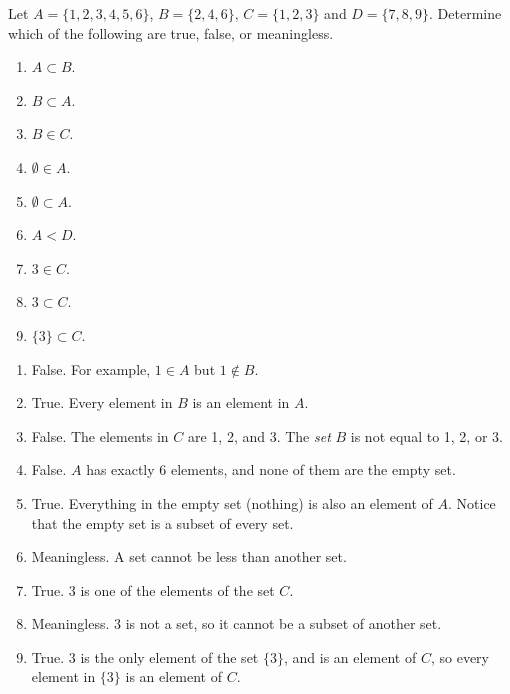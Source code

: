 \documentclass[11pt,]{book}
\theoremstyle{ptxplainnotitle}
\theoremstyle{ptxplaintitle}
\theoremstyle{ptxdefinitionnotitle}
\theoremstyle{ptxdefinitiontitle}
\theoremstyle{ptxdefinitionnotitle}
\theoremstyle{ptxdefinitiontitle}
\theoremstyle{ptxdefinitionnotitle}
\theoremstyle{ptxdefinitiontitle}
\theoremstyle{ptxdefinitiontitlenonumber}
\theoremstyle{ptxdefinitiontitlenonumber}
\numberwithin{equation}{chapter}
\newcommand{\lt}{<}
\begin{document}
\begin{example}\label{example-29}
\hypertarget{p-722}{}%
Let \(A = \{1, 2, 3, 4, 5, 6\}\), \(B = \{2, 4, 6\}\), \(C = \{1, 2, 3\}\) and \(D = \{7, 8, 9\}\). Determine which of the following are true, false, or meaningless.%
\par
\hypertarget{p-723}{}%
\leavevmode%
\begin{enumerate}
\item\hypertarget{li-291}{}\(A \subset B\).%
\item\hypertarget{li-292}{}\(B \subset A\).%
\item\hypertarget{li-293}{}\(B \in C\).%
\item\hypertarget{li-294}{}\(\emptyset \in A\).%
\item\hypertarget{li-295}{}\(\emptyset \subset A\).%
\item\hypertarget{li-296}{}\(A \lt  D\).%
\item\hypertarget{li-297}{}\(3 \in C\).%
\item\hypertarget{li-298}{}\(3 \subset C\).%
\item\hypertarget{li-299}{}\(\{3\} \subset C\).%
\end{enumerate}
%
\par\smallskip%
\noindent\textbf{}\hypertarget{solution-104}{}\hypertarget{p-724}{}%
\leavevmode%
\begin{enumerate}
\item\hypertarget{li-300}{}\hypertarget{p-725}{}%
False. For example, \(1\in A\) but \(1 \notin B\).%
\item\hypertarget{li-301}{}\hypertarget{p-726}{}%
True. Every element in \(B\) is an element in \(A\).%
\item\hypertarget{li-302}{}\hypertarget{p-727}{}%
False. The elements in \(C\) are 1, 2, and 3. The \emph{set} \(B\) is not equal to 1, 2, or 3.%
\item\hypertarget{li-303}{}\hypertarget{p-728}{}%
False. \(A\) has exactly 6 elements, and none of them are the empty set.%
\item\hypertarget{li-304}{}\hypertarget{p-729}{}%
True. Everything in the empty set (nothing) is also an element of \(A\). Notice that the empty set is a subset of every set.%
\item\hypertarget{li-305}{}\hypertarget{p-730}{}%
Meaningless. A set cannot be less than another set.%
\item\hypertarget{li-306}{}\hypertarget{p-731}{}%
True. \(3\) is one of the elements of the set \(C\).%
\item\hypertarget{li-307}{}\hypertarget{p-732}{}%
Meaningless. \(3\) is not a set, so it cannot be a subset of another set.%
\item\hypertarget{li-308}{}\hypertarget{p-733}{}%
True. \(3\) is the only element of the set \(\{3\}\), and is an element of \(C\), so every element in \(\{3\}\) is an element of \(C\).%
\end{enumerate}
%
\end{example}
\end{document}

